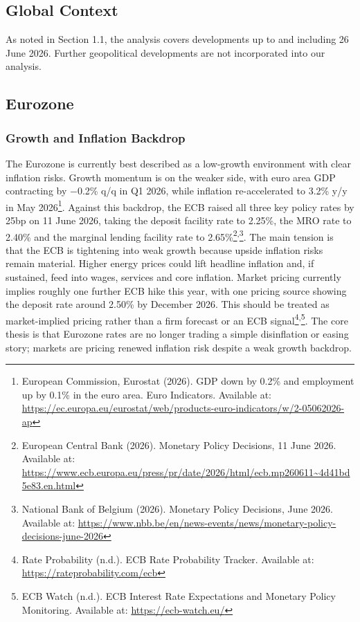 \documentclass[11pt,a4paper]{article}
\begin{document}
\subsection{Global Context}

As noted in Section 1.1, the analysis covers developments up to and including 26 June 2026. Further geopolitical developments are not incorporated into our analysis.

\subsection{Eurozone}

\subsubsection{Growth and Inflation Backdrop}

The Eurozone is currently best described as a low-growth environment with clear inflation risks. Growth momentum is on the weaker side, with euro area GDP contracting by \(-\)0.2\% q/q in Q1 2026, while inflation re-accelerated to 3.2\% y/y in May 2026\footnote{European Commission, Eurostat (2026). GDP down by 0.2\% and employment up by 0.1\% in the euro area. Euro Indicators. Available at: \url{https://ec.europa.eu/eurostat/web/products-euro-indicators/w/2-05062026-ap}}. Against this backdrop, the ECB raised all three key policy rates by 25bp on 11 June 2026, taking the deposit facility rate to 2.25\%, the MRO rate to 2.40\% and the marginal lending facility rate to 2.65\%\footnote{European Central Bank (2026). Monetary Policy Decisions, 11 June 2026. Available at: \url{https://www.ecb.europa.eu/press/pr/date/2026/html/ecb.mp260611~4d41bd5e83.en.html}}\textsuperscript{,}\footnote{National Bank of Belgium (2026). Monetary Policy Decisions, June 2026. Available at: \url{https://www.nbb.be/en/news-events/news/monetary-policy-decisions-june-2026}}. The main tension is that the ECB is tightening into weak growth because upside inflation risks remain material. Higher energy prices could lift headline inflation and, if sustained, feed into wages, services and core inflation. Market pricing currently implies roughly one further ECB hike this year, with one pricing source showing the deposit rate around 2.50\% by December 2026. This should be treated as market-implied pricing rather than a firm forecast or an ECB signal\footnote{Rate Probability (n.d.). ECB Rate Probability Tracker. Available at: \url{https://rateprobability.com/ecb}}\textsuperscript{,}\footnote{ECB Watch (n.d.). ECB Interest Rate Expectations and Monetary Policy Monitoring. Available at: \url{https://ecb-watch.eu/}}. The core thesis is that Eurozone rates are no longer trading a simple disinflation or easing story; markets are pricing renewed inflation risk despite a weak growth backdrop.
\end{document}
